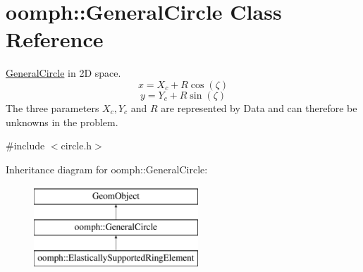 \hypertarget{classoomph_1_1GeneralCircle}{}\section{oomph\+:\+:General\+Circle Class Reference}
\label{classoomph_1_1GeneralCircle}


\hyperlink{classoomph_1_1GeneralCircle}{General\+Circle} in 2D space. \[ x = X_c + R \cos(\zeta) \] \[ y = Y_c + R \sin(\zeta) \] The three parameters $ X_c, Y_c $ and $ R $ are represented by Data and can therefore be unknowns in the problem.  




{\ttfamily \#include $<$circle.\+h$>$}

Inheritance diagram for oomph\+:\+:General\+Circle\+:\begin{figure}[H]
\begin{center}
\leavevmode
\includegraphics[height=3.000000cm]{classoomph_1_1GeneralCircle}
\end{center}
\end{figure}
